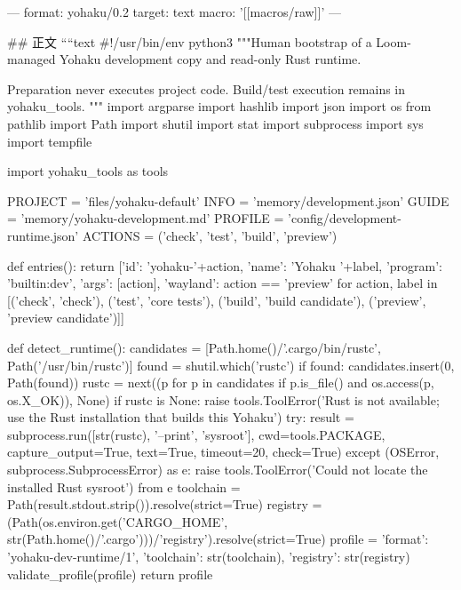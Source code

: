 ---
format: yohaku/0.2
target: text
macro: '[[macros/raw]]'
---

## 正文
````text
#!/usr/bin/env python3
"""Human bootstrap of a Loom-managed Yohaku development copy and read-only Rust runtime.

Preparation never executes project code. Build/test execution remains in yohaku_tools.
"""
import argparse
import hashlib
import json
import os
from pathlib import Path
import shutil
import stat
import subprocess
import sys
import tempfile

import yohaku_tools as tools

PROJECT = 'files/yohaku-default'
INFO = 'memory/development.json'
GUIDE = 'memory/yohaku-development.md'
PROFILE = 'config/development-runtime.json'
ACTIONS = ('check', 'test', 'build', 'preview')


def entries():
    return [{'id': 'yohaku-'+action, 'name': 'Yohaku '+label,
             'program': 'builtin:dev', 'args': [action], 'wayland': action == 'preview'}
            for action, label in [('check', 'check'), ('test', 'core tests'),
                                  ('build', 'build candidate'), ('preview', 'preview candidate')]]


def detect_runtime():
    candidates = [Path.home()/'.cargo/bin/rustc', Path('/usr/bin/rustc')]
    found = shutil.which('rustc')
    if found: candidates.insert(0, Path(found))
    rustc = next((p for p in candidates if p.is_file() and os.access(p, os.X_OK)), None)
    if rustc is None: raise tools.ToolError('Rust is not available; use the Rust installation that builds this Yohaku')
    try:
        result = subprocess.run([str(rustc), '--print', 'sysroot'], cwd=tools.PACKAGE,
                                capture_output=True, text=True, timeout=20, check=True)
    except (OSError, subprocess.SubprocessError) as e:
        raise tools.ToolError('Could not locate the installed Rust sysroot') from e
    toolchain = Path(result.stdout.strip()).resolve(strict=True)
    registry = (Path(os.environ.get('CARGO_HOME', str(Path.home()/'.cargo')))/'registry').resolve(strict=True)
    profile = {'format': 'yohaku-dev-runtime/1', 'toolchain': str(toolchain), 'registry': str(registry)}
    validate_profile(profile)
    return profile



